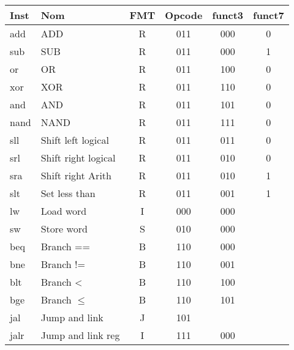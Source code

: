 \documentclass[a4paper]{article}
\begin{document}
    \begin{tabular}{|l|l|c|c|c|c|}
        \hline
        Inst & Nom                  & FMT & Opcode & funct3 & funct7 \\
        \hline
        add  & ADD                  & R   & 011    & 000    & 0      \\
        sub  & SUB                  & R   & 011    & 000    & 1      \\
        or   & OR                   & R   & 011    & 100    & 0      \\
        xor  & XOR                  & R   & 011    & 110    & 0      \\
        and  & AND                  & R   & 011    & 101    & 0      \\
        nand & NAND                 & R   & 011    & 111    & 0      \\
        sll  & Shift left logical   & R   & 011    & 011    & 0      \\
        srl  & Shift right logical  & R   & 011    & 010    & 0      \\
        sra  & Shift right Arith    & R   & 011    & 010    & 1      \\
        slt  & Set less than        & R   & 011    & 001    & 1      \\
        \hline
        lw   & Load word            & I   & 000    & 000    &        \\
        sw   & Store word           & S   & 010    & 000    &        \\
        \hline
        beq  & Branch ==            & B   & 110    & 000    &        \\
        bne  & Branch !=            & B   & 110    & 001    &        \\
        blt  & Branch <             & B   & 110    & 100    &        \\
        bge  & Branch \(\leqslant\) & B   & 110    & 101    &        \\
        \hline
        jal  & Jump and link        & J   & 101    &        &        \\
        jalr & Jump and link reg    & I   & 111    & 000    &        \\
        \hline
    \end{tabular}
\end{document}

